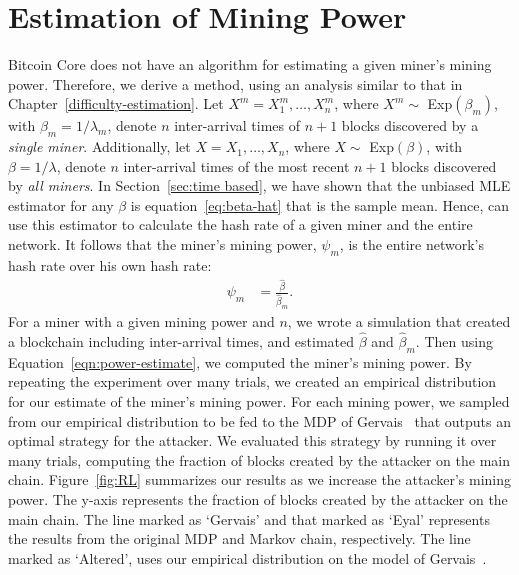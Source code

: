\section{Estimation of Mining Power}
Bitcoin Core does not have an algorithm for estimating a given miner's mining power. Therefore, we derive a method, using an analysis similar to that in Chapter~\ref{difficulty-estimation}.
Let $X^m = X_1^m, \dots, X_{n}^m$, where $X^m \sim$ Exp$(\beta_m)$, with $\beta_m = 1/\lambda_m$, denote $n$ inter-arrival times of $n+1$ blocks discovered by a {\em single miner}. Additionally, let $X = X_1, \dots, X_{n}$, where $X \sim$ Exp$(\beta)$, with $\beta = 1/\lambda$, denote $n$ inter-arrival times of the most recent $n+1$ blocks discovered by {\em all miners}.
In Section~\ref{sec:time based}, we have shown that the unbiased MLE estimator for any $\beta$ is equation~\ref{eq:beta-hat} that is the sample mean. Hence, can use this estimator to calculate the hash rate of a given miner and the entire network. It follows that the miner's mining power, $\psi_m$, is the entire network's hash rate over his own hash rate:
\begin{align}
\psi_m &= \frac{\hat{\beta}}{\hat{\beta}_m}.\label{eqn:power-estimate}
\end{align} 
 For a miner with a given mining power and $n$, we wrote a simulation that created a blockchain including inter-arrival times, and estimated $\hat{\beta}$ and $\hat{\beta}_m$. Then using Equation~\ref{eqn:power-estimate}, we computed the miner's mining power. By repeating the experiment over many trials, we created an empirical distribution for our estimate of the miner's mining power. For each mining power, we sampled from our empirical distribution to be fed to the MDP of Gervais~\cite{Gervais:2016} that outputs an optimal strategy for the attacker. We evaluated this strategy by running it over many trials, computing the fraction of blocks created by the attacker on the main chain. Figure~\ref{fig:RL} summarizes our results as we increase the attacker's mining power. The y-axis represents the fraction of blocks created by the attacker on the main chain. The line marked as `Gervais' and that marked as `Eyal' represents the results from the original MDP and Markov chain, respectively. The line marked as `Altered', uses our empirical distribution on the model of Gervais~\cite{Gervais:2016}. 

